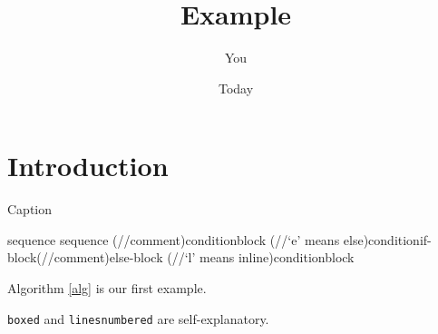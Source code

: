 \documentclass{article}
\title{Example}
\author{You}
\date{Today}
\begin{document}
\maketitle

\section{Introduction}
\begin{algorithm}
\caption{Caption}\label{alg}
sequence\;
sequence\;
\For(//comment){condition}{block}
\eIf(//`e' means else){condition}{if-block}(//comment){else-block}
\lIf(//`l' means inline){condition}{block}
\end{algorithm}

Algorithm \ref{alg} is our first example.


\verb+boxed+ and \verb+linesnumbered+ are self-explanatory.
\end{document}
